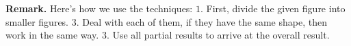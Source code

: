 \begin{multicols}{2}
\begin{figure}[H]
		\vspace*{-10pt} 
	\end{figure}
	\textbf{\color{toancuabi}Remark.} Here's how we use the techniques:
	\vskip 0.1cm
	$1.$ First, divide the given figure into smaller figures.
	\vskip 0.1cm
	$3$. Deal with each of them, if they have the same shape, then work in the same way.
	\vskip 0.1cm
	$3.$ Use all partial results to arrive at the overall result.
	\vskip 0.2cm

\end{multicols}
